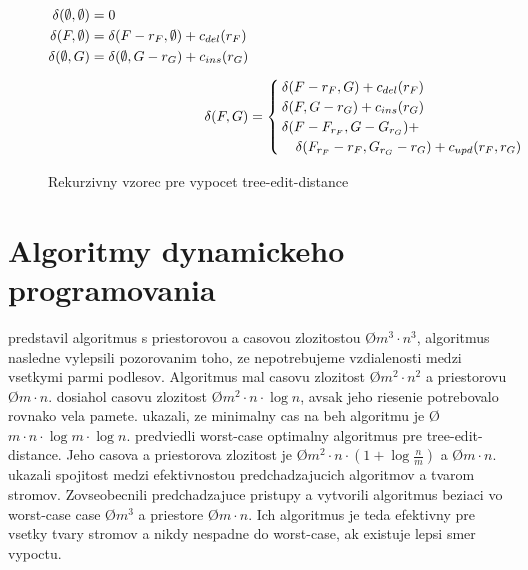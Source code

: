\begin{figure}[H]
  \begin{subequations}
  \begin{align*}
    \begin{split}
    \delta(\emptyset, \emptyset) &=
      0
      \\
    \delta(F, \emptyset) &=
      \delta(F - r_{F}, \emptyset) + c_{del}(r_{F})
      \\
    \delta(\emptyset, G) &=
      \delta(\emptyset, G - r_{G}) + c_{ins}(r_{G})
    \end{split}
    \\[1ex]
    \delta(F, G) &=
      \begin{cases}
        \delta(F - r_{F}, G) + c_{del}(r_{F}) \\
        \delta(F, G - r_{G}) + c_{ins}(r_{G}) \\
        \delta(F - F_{r_{F}}, G - G_{r_{G}}) + \\
          \quad \delta(F_{r_{F}} - r_{F}, G_{r_{G}} - r_{G}) + c_{upd}(r_{F}, r_{G})
      \end{cases}
  \end{align*}
  \end{subequations}
  \caption{Rekurzivny vzorec pre vypocet tree-edit-distance}
  \label{eq:ted}
\end{figure}


\section{Algoritmy dynamickeho programovania}

\citet{TAI} predstavil algoritmus s priestorovou a casovou zlozitostou \O{$m^3 \cdot n^3$},
\citet{ZHANGSHASHA} algoritmus nasledne vylepsili pozorovanim toho, ze nepotrebujeme
vzdialenosti medzi vsetkymi parmi podlesov. Algoritmus mal casovu zlozitost \O{$m^2 \cdot n^2$}
a priestorovu \O{$m \cdot n$}. \citet{KLEIN} dosiahol casovu zlozitost \O{$m^2 \cdot n \cdot \log{n}$},
avsak jeho riesenie potrebovalo rovnako vela pamete.
\citet{DALUCQ} ukazali, ze minimalny cas na beh algoritmu je \O{$m \cdot n \cdot \log{m} \cdot \log{n}$}.
\citet{DMRW} predviedli worst-case optimalny algoritmus pre tree-edit-distance.
Jeho casova a priestorova zlozitost je \O{$m^2 \cdot n \cdot (1 + \log{\frac{n}{m}})$} a
\O{$m \cdot n$}. \citet{RTED} ukazali spojitost medzi efektivnostou predchadzajucich algoritmov
a tvarom stromov. Zovseobecnili predchadzajuce pristupy a vytvorili algoritmus beziaci
vo worst-case case \O{$m^3$} a priestore \O{$m \cdot n$}. Ich algoritmus je teda efektivny pre vsetky
tvary stromov a nikdy nespadne do worst-case, ak existuje lepsi smer vypoctu. 



